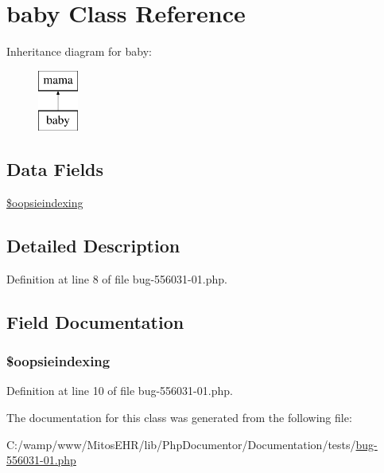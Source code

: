 \hypertarget{classbaby}{\section{baby \-Class \-Reference}
\label{classbaby}
}
\-Inheritance diagram for baby\-:\begin{figure}[H]
\begin{center}
\leavevmode
\includegraphics[height=2.000000cm]{classbaby}
\end{center}
\end{figure}
\subsection*{\-Data \-Fields}
\begin{DoxyCompactItemize}
\item 
\hyperlink{classbaby_abe966e9721a2478c8b171ae180914307}{\$oopsieindexing}
\end{DoxyCompactItemize}


\subsection{\-Detailed \-Description}


\-Definition at line 8 of file bug-\/556031-\/01.\-php.



\subsection{\-Field \-Documentation}
\hypertarget{classbaby_abe966e9721a2478c8b171ae180914307}{
\subsubsection[{\$oopsieindexing}]{\setlength{\rightskip}{0pt plus 5cm}\$oopsieindexing}}\label{classbaby_abe966e9721a2478c8b171ae180914307}


\-Definition at line 10 of file bug-\/556031-\/01.\-php.



\-The documentation for this class was generated from the following file\-:\begin{DoxyCompactItemize}
\item 
\-C\-:/wamp/www/\-Mitos\-E\-H\-R/lib/\-Php\-Documentor/\-Documentation/tests/\hyperlink{bug-556031-01_8php}{bug-\/556031-\/01.\-php}\end{DoxyCompactItemize}

